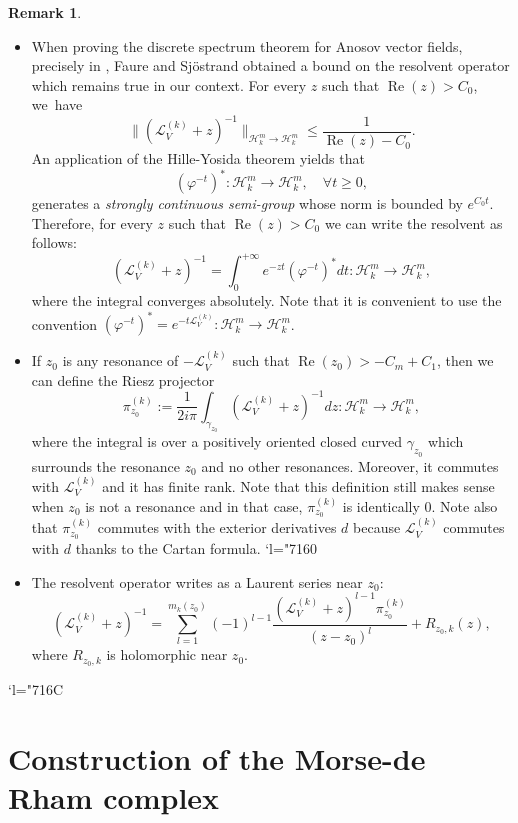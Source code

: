 \documentclass[JEP,XML,SOM,Unicode,NoEqCountersInSection,NoFloatCountersInSection,published]{cedram}
\newcommand{\Changel}{\mathcode`l="7160}
\newcommand{\Changelback}{\mathcode`l="716C}
\theoremstyle{definition}
\newtheorem{remark}[definition]{Remark}
\theoremstyle{plain}
\newcommand{\Hil}{\mathcal{H}}
\newcommand{\Lie}{\mathcal{L}}
\DeclareMathOperator{\re}{Re}
\begin{document}
\skpt
\begin{remark}
\begin{itemize}
\item When proving the discrete spectrum theorem for Anosov vector fields, precisely in \cite[Lem.\,3.3, p.\,343]{FS}, Faure and Sjöstrand obtained a bound on the resolvent operator which remains true in our context. For every $z$ such that \hbox{$\re (z) \!>\! C_0$}, we~have
\[
\| (\Lie_V^{(k)} + z)^{-1} \|_{\Hil_k^m \to \Hil_k^m} \leq \frac{1}{\re (z) - C_0}.
\]
An application of the Hille-Yosida theorem \cite[Cor.\,3.6, p.\,76]{engel-nagel} yields that
\[
(\varphi^{-t})^*: \Hil_k^m \to \Hil_k^m, \quad \forall t \geq 0,
\]
generates a \emph{strongly continuous semi-group} whose norm is bounded by $e^{C_0 t}$. Therefore, for every $z$ such that $\re (z) > C_0$ we can write the resolvent as follows:
\[
(\Lie_V^{(k)} + z)^{-1} = \int_0^{+\infty} e^{-zt } (\varphi^{-t})^* dt: \Hil_k^m \to \Hil_k^m,
\]
where the integral converges absolutely. Note that it is convenient to use the convention $(\varphi^{-t})^* = e^{-t \Lie_V^{(k)}}: \Hil_k^m \to \Hil_k^m$.
\item If $z_0 $ is any resonance of $-\Lie_V^{(k)}$ such that $\re (z_0) > -C_m + C_1$, then we can define the Riesz projector
\[
\pi_{z_0}^{(k)}:= \frac{1}{2 i \pi} \int_{\gamma_{z_0}} (\Lie_V^{(k)} + z)^{-1} dz: \Hil_k^m \to \Hil_k^m,
\]
where the integral is over a positively oriented closed curved $\gamma_{z_0}$ which surrounds the resonance $z_0$ and no other resonances. Moreover, it commutes with $\Lie_V^{(k)}$ and it has finite rank. Note that this definition still makes sense when $z_0$ is not a resonance and in that case, $\pi_{z_0}^{(k)}$ is identically $0$. Note also that $\pi_{z_0}^{(k)}$ commutes with the exterior derivatives $d$ because $\Lie_V^{(k)}$ commutes with $d$ thanks to the Cartan formula.
\Changel
\item The resolvent operator writes as a Laurent series near $z_0$:
\[
(\Lie_V^{(k)} + z)^{-1} = \sum_{l = 1}^{m_k (z_0)} (-1)^{l-1} \frac{(\Lie_V^{(k)} + z)^{l-1} \pi_{z_0}^{(k)}}{(z - z_0)^{l}} + R_{z_0,k} (z),
\]
where $R_{z_0,k}$ is holomorphic near $z_0$.
\end{itemize}
\Changelback
\end{remark}

\section{Construction of the Morse-de Rham complex} \label{section topology}
\end{document}
